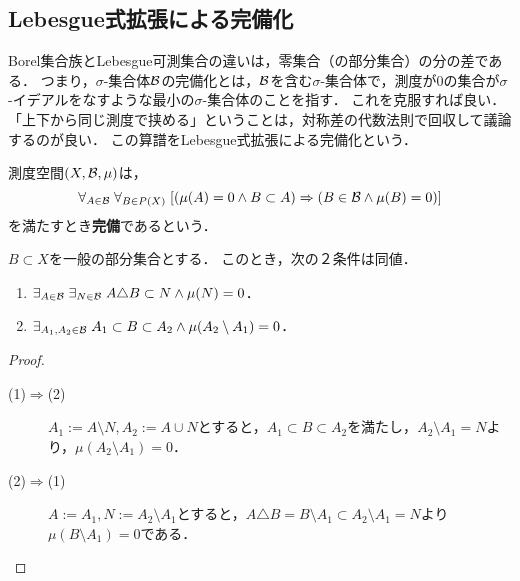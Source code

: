 \documentclass[uplatex, dvipdfmx]{jsreport}
\begin{document}
\subsection{Lebesgue式拡張による完備化}

\begin{tcolorbox}[colframe=ForestGreen, colback=ForestGreen!10!white,breakable,colbacktitle=ForestGreen!40!white,coltitle=black,fonttitle=\bfseries\sffamily,
title=]
    Borel集合族とLebesgue可測集合の違いは，零集合（の部分集合）の分の差である．
    つまり，$\sigma$-集合体$\mathcal{B}$の完備化とは，$\mathcal{B}$を含む$\sigma$-集合体で，測度が$0$の集合が$\sigma$-イデアルをなすような最小の$\sigma$-集合体のことを指す．
    これを克服すれば良い．
    「上下から同じ測度で挟める」ということは，対称差の代数法則で回収して議論するのが良い．
    この算譜をLebesgue式拡張による完備化という．
\end{tcolorbox}

\begin{definition}[complete]
    測度空間$(X,\mathcal{B},\mu)$は，
    \[\forall_{A\in\mathcal{B}}\;\forall_{B\in P(X)}\;[(\mu(A)=0\land B\subset A)\Rightarrow (B\in\mathcal{B}\land\mu(B)=0)]\]
    を満たすとき\textbf{完備}であるという．
\end{definition}

\begin{lemma}[目標の対称差による特徴付け]\label{lemma-completeness}
    $B\subset X$を一般の部分集合とする．
    このとき，次の２条件は同値．
    \begin{enumerate}
        \item $\exists_{A\in\mathcal{B}}\;\exists_{N\in\mathcal{B}}\;A\triangle B\subset N\land\mu(N)=0$．
        \item $\exists_{A_1,A_2\in\mathcal{B}}\;A_1\subset B\subset A_2\land\mu(A_2\setminus A_1)=0$．
    \end{enumerate}
\end{lemma}
\begin{proof}\mbox{}
    \begin{description}
        \item[(1)$\Rightarrow$(2)] $A_1:=A\setminus N,A_2:=A\cup N$とすると，$A_1\subset B\subset A_2$を満たし，$A_2\setminus A_1=N$より，$\mu(A_2\setminus A_1)=0$．
        \item[(2)$\Rightarrow$(1)] $A:=A_1,N:=A_2\setminus A_1$とすると，$A\triangle B=B\setminus A_1\subset A_2\setminus A_1=N$より$\mu(B\setminus A_1)=0$である．
    \end{description}
\end{proof}
\end{document}
